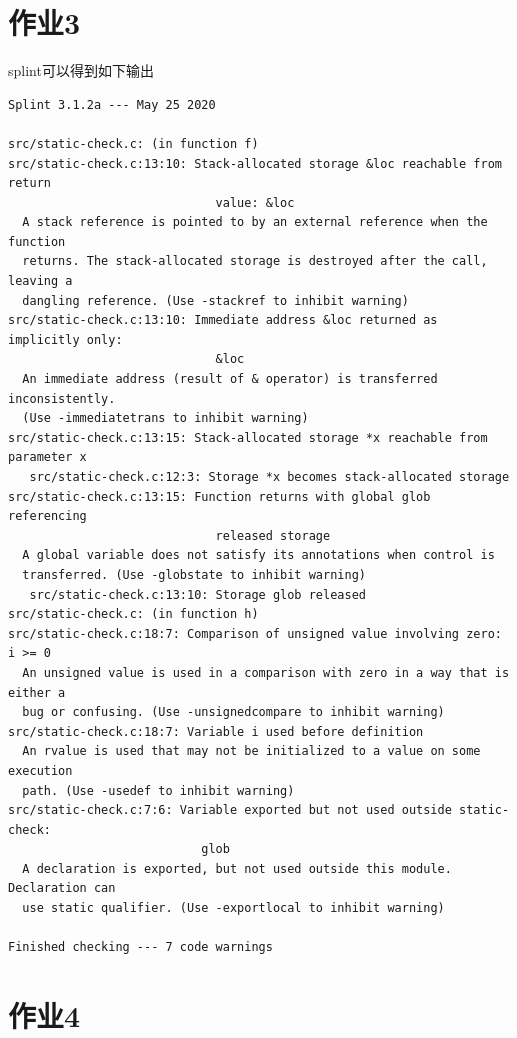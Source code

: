 \documentclass[UTF8,a4paper,10pt]{ctexart}
\begin{document}
\section{作业3}
splint可以得到如下输出
\begin{verbatim}
Splint 3.1.2a --- May 25 2020

src/static-check.c: (in function f)
src/static-check.c:13:10: Stack-allocated storage &loc reachable from return
                             value: &loc
  A stack reference is pointed to by an external reference when the function
  returns. The stack-allocated storage is destroyed after the call, leaving a
  dangling reference. (Use -stackref to inhibit warning)
src/static-check.c:13:10: Immediate address &loc returned as implicitly only:
                             &loc
  An immediate address (result of & operator) is transferred inconsistently.
  (Use -immediatetrans to inhibit warning)
src/static-check.c:13:15: Stack-allocated storage *x reachable from parameter x
   src/static-check.c:12:3: Storage *x becomes stack-allocated storage
src/static-check.c:13:15: Function returns with global glob referencing
                             released storage
  A global variable does not satisfy its annotations when control is
  transferred. (Use -globstate to inhibit warning)
   src/static-check.c:13:10: Storage glob released
src/static-check.c: (in function h)
src/static-check.c:18:7: Comparison of unsigned value involving zero: i >= 0
  An unsigned value is used in a comparison with zero in a way that is either a
  bug or confusing. (Use -unsignedcompare to inhibit warning)
src/static-check.c:18:7: Variable i used before definition
  An rvalue is used that may not be initialized to a value on some execution
  path. (Use -usedef to inhibit warning)
src/static-check.c:7:6: Variable exported but not used outside static-check:
                           glob
  A declaration is exported, but not used outside this module. Declaration can
  use static qualifier. (Use -exportlocal to inhibit warning)

Finished checking --- 7 code warnings
\end{verbatim}

\section{作业4}
\end{document}
